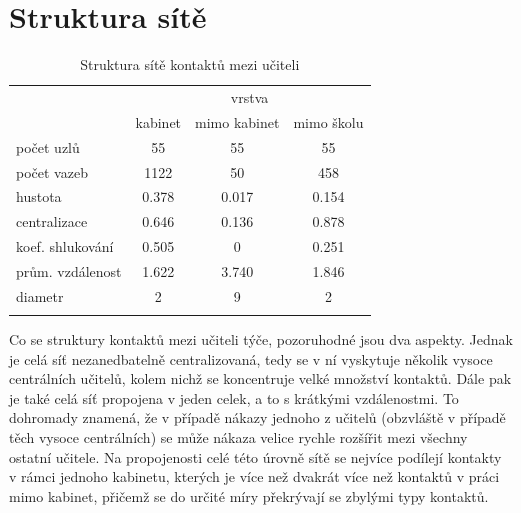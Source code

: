 \section*{Struktura sítě} 

\begin{table}[]
    \centering
    \caption{Struktura sítě kontaktů mezi učiteli}
\begin{tabular}{lccc}
\hline
                 & \multicolumn{3}{c}{vrstva}                                                                      \\ 
                 & \multicolumn{1}{l}{kabinet} & \multicolumn{1}{l}{mimo kabinet} & \multicolumn{1}{l}{mimo školu} \\ \hline
počet uzlů       & 55                          & 55                               & 55                             \\
počet vazeb      & 1122                        & 50                               & 458                            \\
hustota          & 0.378                       & 0.017                            & 0.154                          \\
centralizace     & 0.646                       & 0.136                            & 0.878                          \\
koef. shlukování & 0.505                       & 0                                & 0.251                          \\
prům. vzdálenost & 1.622                       & 3.740                            & 1.846                          \\
diametr          & 2                           & 9                                & 2                              \\ \hline
\label{fig:100-teachers}
\end{tabular}
\end{table}

Co se struktury kontaktů mezi učiteli týče, pozoruhodné jsou dva aspekty. Jednak je celá síť nezanedbatelně centralizovaná, tedy se v ní vyskytuje několik vysoce centrálních učitelů, kolem nichž se koncentruje velké množství kontaktů. Dále pak je také celá síť propojena v jeden celek, a to s krátkými vzdálenostmi. To dohromady znamená, že v případě nákazy jednoho z učitelů (obzvláště v případě těch vysoce centrálních) se může nákaza velice rychle rozšířit mezi všechny ostatní učitele. Na propojenosti celé této úrovně sítě se nejvíce podílejí kontakty v rámci jednoho kabinetu, kterých je více než dvakrát více než kontaktů v práci mimo kabinet, přičemž se do určité míry překrývají se zbylými typy kontaktů. 

